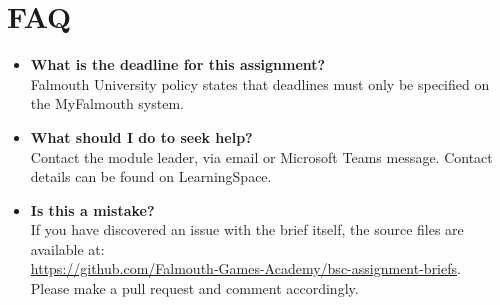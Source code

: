 \documentclass{../../fal_assignment}
\begin{document}

\section*{FAQ}

\begin{itemize}
	\item 	\textbf{What is the deadline for this assignment?} \\ 
    		Falmouth University policy states that deadlines must only be specified on the MyFalmouth system.
    		
	\item 	\textbf{What should I do to seek help?} \\ 
            Contact the module leader, via email or Microsoft Teams message. Contact details can be found on LearningSpace.
    
    	\item 	\textbf{Is this a mistake?} \\ 	
    		If you have discovered an issue with the brief itself, the source files are available at: \\
    		\url{https://github.com/Falmouth-Games-Academy/bsc-assignment-briefs}.\\
    		 Please make a pull request and comment accordingly.
\end{itemize}


\end{document}
